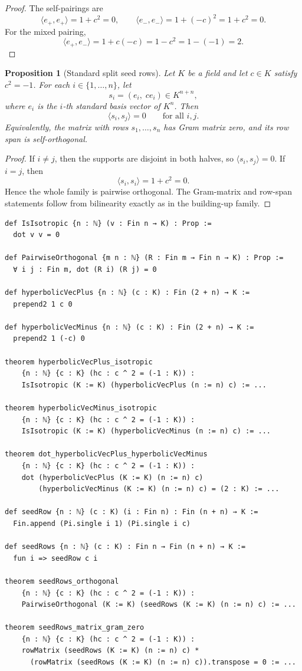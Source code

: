 \documentclass[12pt]{article}
\newtheorem{prop}[theorem]{Proposition}
\begin{document}
\begin{proof}
The self-pairings are
\[
\langle e_+,e_+\rangle = 1+c^2 = 0,
\qquad
\langle e_-,e_-\rangle = 1+(-c)^2 = 1+c^2 = 0.
\]
For the mixed pairing,
\[
\langle e_+,e_-\rangle = 1+c(-c)=1-c^2=1-(-1)=2.
\]
\end{proof}

\begin{prop}[Standard split seed rows]
\label{prop:seed-rows}
Let $K$ be a field and let $c\in K$ satisfy $c^2=-1$. For each $i\in\{1,\dots,n\}$, let
\[
s_i=(e_i,\; c e_i)\in K^{n+n},
\]
where $e_i$ is the $i$-th standard basis vector of $K^n$. Then
\[
\langle s_i,s_j\rangle = 0
\qquad
\text{for all } i,j.
\]
Equivalently, the matrix with rows $s_1,\dots,s_n$ has Gram matrix zero, and its row span is self-orthogonal.
\end{prop}

\begin{proof}
If $i\neq j$, then the supports are disjoint in both halves, so $\langle s_i,s_j\rangle=0$. If $i=j$, then
\[
\langle s_i,s_i\rangle = 1 + c^2 = 0.
\]
Hence the whole family is pairwise orthogonal. The Gram-matrix and row-span statements follow from bilinearity exactly as in the building-up family.
\end{proof}

\begin{lstlisting}[caption={Lean verification for Propositions~\ref{prop:hyperbolic-pair} and~\ref{prop:seed-rows}.}]
def IsIsotropic {n : ℕ} (v : Fin n → K) : Prop :=
  dot v v = 0

def PairwiseOrthogonal {m n : ℕ} (R : Fin m → Fin n → K) : Prop :=
  ∀ i j : Fin m, dot (R i) (R j) = 0

def hyperbolicVecPlus {n : ℕ} (c : K) : Fin (2 + n) → K :=
  prepend2 1 c 0

def hyperbolicVecMinus {n : ℕ} (c : K) : Fin (2 + n) → K :=
  prepend2 1 (-c) 0

theorem hyperbolicVecPlus_isotropic
    {n : ℕ} {c : K} (hc : c ^ 2 = (-1 : K)) :
    IsIsotropic (K := K) (hyperbolicVecPlus (n := n) c) := ...

theorem hyperbolicVecMinus_isotropic
    {n : ℕ} {c : K} (hc : c ^ 2 = (-1 : K)) :
    IsIsotropic (K := K) (hyperbolicVecMinus (n := n) c) := ...

theorem dot_hyperbolicVecPlus_hyperbolicVecMinus
    {n : ℕ} {c : K} (hc : c ^ 2 = (-1 : K)) :
    dot (hyperbolicVecPlus (K := K) (n := n) c)
        (hyperbolicVecMinus (K := K) (n := n) c) = (2 : K) := ...

def seedRow {n : ℕ} (c : K) (i : Fin n) : Fin (n + n) → K :=
  Fin.append (Pi.single i 1) (Pi.single i c)

def seedRows {n : ℕ} (c : K) : Fin n → Fin (n + n) → K :=
  fun i => seedRow c i

theorem seedRows_orthogonal
    {n : ℕ} {c : K} (hc : c ^ 2 = (-1 : K)) :
    PairwiseOrthogonal (K := K) (seedRows (K := K) (n := n) c) := ...

theorem seedRows_matrix_gram_zero
    {n : ℕ} {c : K} (hc : c ^ 2 = (-1 : K)) :
    rowMatrix (seedRows (K := K) (n := n) c) *
      (rowMatrix (seedRows (K := K) (n := n) c)).transpose = 0 := ...
\end{lstlisting}
\end{document}
